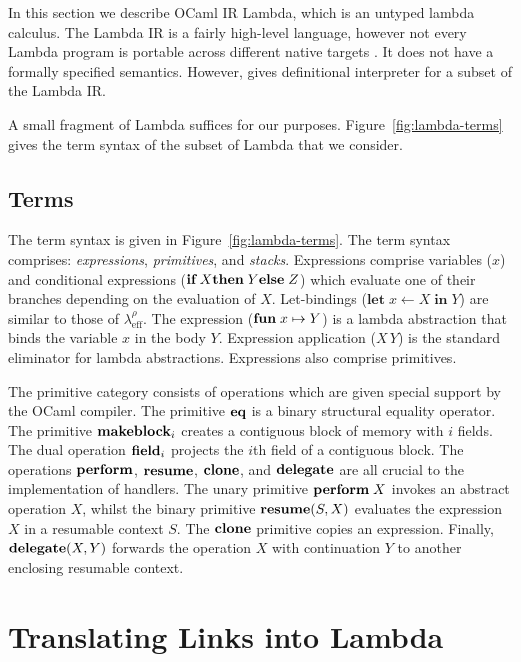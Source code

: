 \documentclass[12pt,mscres,cdtppar,twoside,openright,logo,rightchapter,normalheadings]{infthesis}
\theoremstyle{definition}
\newcommand{\Calc}{\ensuremath{\lambda_{\text{eff}}^\rho}\xspace}
\newcommand{\revto}{\ensuremath{\leftarrow}}
\newcommand{\keyw}[1]{\textbf{#1}}
\newcommand{\Let}{\keyw{let}}
\newcommand{\In}{\keyw{in}}
\begin{document}
In this section we describe OCaml IR Lambda, which is an untyped
lambda calculus. The Lambda IR is a fairly high-level language,
however not every Lambda program is portable across different native
targets \citep{Dolan2016}. It does not have a formally specified
semantics. However, \citet{Dolan2016} gives definitional interpreter
for a subset of the Lambda IR.

A small fragment of Lambda suffices for our purposes.
Figure~\ref{fig:lambda-terms} gives the term syntax of the subset of
Lambda that we consider.

\subsection{Terms} 
The term syntax is given in Figure~\ref{fig:lambda-terms}. The term
syntax comprises: \emph{expressions}, \emph{primitives}, and
\emph{stacks}. Expressions comprise variables ($x$) and conditional
expressions ($\If\; X \Then\; Y \Else\; Z$) which evaluate one of
their branches depending on the evaluation of $X$. Let-bindings
($\Let\; x \revto X\; \In \; Y$) are similar to those of \Calc. The
expression ($\Fun \; x \mapsto Y$) is a lambda abstraction that binds
the variable $x$ in the body $Y$. Expression application ($X\,Y$) is
the standard eliminator for lambda abstractions. Expressions also
comprise primitives.

The primitive category consists of operations which are given special
support by the OCaml compiler.  The primitive $\Eq$ is a binary
structural equality operator. The primitive $\Makeblock_i$ creates a
contiguous block of memory with $i$ fields. The dual operation
$\Field_i$ projects the $i$th field of a contiguous block.  The
operations $\Perform$, $\Resume$, $\Clone$, and $\Delegate$ are all
crucial to the implementation of handlers. The unary primitive
$\Perform \; X$ invokes an abstract operation $X$, whilst the binary
primitive $\Resume(S,X)$ evaluates the expression $X$ in a resumable
context $S$. The $\Clone$ primitive copies an expression. Finally,
$\Delegate(X,Y)$ forwards the operation $X$ with continuation $Y$ to
another enclosing resumable context.

\section{Translating Links into Lambda}
\label{sec:translation}

\newcommand{\trans}[1]{\llbracket #1 \rrbracket}
\newcommand{\mtrans}[1]{\trans{#1}_\mathcal{M}}
\newcommand{\vtrans}[1]{\trans{#1}_\mathcal{V}}
\newcommand{\htrans}[1]{\trans{#1}_\mathcal{H}}
\newcommand{\hptrans}[1]{\trans{#1}_{\mathcal{H}'}}
\end{document}

